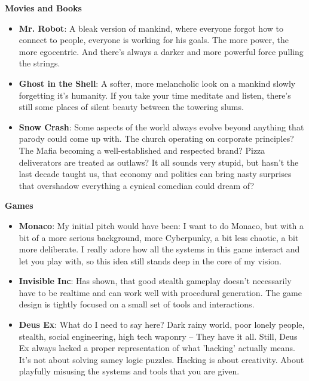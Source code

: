 \documentclass[11pt,a4paper, twocolumn]{article}
\begin{document}
\textbf{Movies and Books}

\begin{itemize}
    \item \textbf{Mr. Robot}: A bleak version of mankind, where everyone forgot how to connect to people,
            everyone is working for his goals. The more power, the more egocentric. And there's
            always a darker and more powerful force pulling the strings.
    \item \textbf{Ghost in the Shell}: A softer, more melancholic look on a mankind slowly forgetting it's
            humanity. If you take your time meditate and listen, there's still some places of silent
            beauty between the towering slums.
    \item \textbf{Snow Crash}: Some aspects of the world always evolve beyond anything that parody could come
            up with. The church operating on corporate principles? The Mafia becoming a
            well-established and respected brand? Pizza deliverators are treated as outlaws?
            It all sounds very stupid, but hasn't the last decade taught us, that economy and politics
            can bring nasty surprises that overshadow everything a cynical comedian could dream of?
\end{itemize}

\textbf{Games}

\begin{itemize}
    \item \textbf{Monaco}: My initial pitch would have been: I want to do Monaco, but with a bit of a more serious
                background, more Cyberpunky, a bit less chaotic, a bit more deliberate. I really adore how all
                the systems in this game interact and let you play with, so this idea still stands deep in the
                core of my vision.
    \item \textbf{Invisible Inc}: Has shown, that good stealth gameplay doesn't necessarily have to be realtime
                and can work well with procedural generation. The game design is tightly focused on a small set
                of tools and interactions.
    \item \textbf{Deus Ex}: What do I need to say here? Dark rainy world, poor lonely people, stealth,
                social engineering, high tech waponry -- They have it all. Still, Deus Ex always lacked a proper representation of
                what 'hacking' actually means. It's not about solving samey logic puzzles. Hacking is about creativity.
                About playfully misusing the systems and tools that you are given.
\end{itemize}
\end{document}
